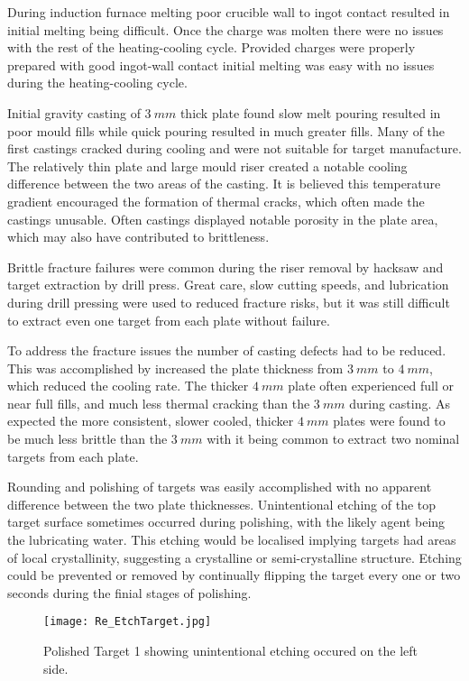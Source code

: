 \documentclass[a4paper,12pt,oneside]{report}%
\begin{document}
During induction furnace melting poor crucible wall to ingot contact resulted in initial melting being difficult. Once the charge was molten there were no issues with the rest of the heating-cooling cycle. Provided charges were properly prepared with good ingot-wall contact initial melting was easy with no issues during the heating-cooling cycle. 

Initial gravity casting of $3~ mm$ thick plate found slow melt pouring resulted in poor mould fills while quick pouring resulted in much greater fills. Many of the first castings cracked during cooling and were not suitable for target manufacture. The relatively thin plate and large mould riser created a notable cooling difference between the two areas of the casting. It is believed this temperature gradient encouraged the formation of thermal cracks, which often made the castings unusable. Often castings displayed notable porosity in the plate area, which may also have contributed to brittleness. 

Brittle fracture failures were common during the riser removal by hacksaw and target extraction by drill press. Great care, slow cutting speeds, and lubrication during drill pressing were used to reduced fracture risks, but it was still difficult to extract even one target from each plate without failure.

To address the fracture issues the number of casting defects had to be reduced. This was accomplished by increased the plate thickness from $3~ mm$ to $4~ mm$, which reduced the cooling rate. The thicker $4~ mm$ plate often experienced full or near full fills, and much less thermal cracking than the $3~ mm$ during casting. As expected the more consistent, slower cooled, thicker $4~ mm$ plates were found to be much less brittle than the $3~ mm$ with it being common to extract two nominal targets from each plate.

Rounding and polishing of targets was easily accomplished with no apparent difference between the two plate thicknesses. Unintentional etching of the top target surface sometimes occurred during polishing, with the likely agent being the lubricating water. This etching would be localised implying targets had areas of local crystallinity, suggesting a crystalline or semi-crystalline structure. Etching could be prevented or removed by continually flipping the target every one or two seconds during the finial stages of polishing. 

\begin{figure}[htbp]
	\centering
	\texttt{[image: Re\_EtchTarget.jpg]}
	\caption{Polished Target 1 showing unintentional etching occured on the left side.}
	\label{fig:EtchedTarget}
\end{figure}
\end{document}
